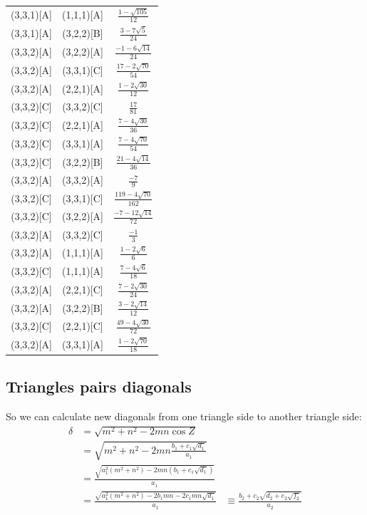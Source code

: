 \documentclass[11pt]{article}
\begin{document}
\begin{center}
\begin{tabular}{||c c c ||}
(3,3,1)[A] & (1,1,1)[A] & $\frac{1-\sqrt{105}}{12}$\\
(3,3,1)[A] & (3,2,2)[B] & $\frac{3-7\sqrt{5}}{24}$\\
 \hline
(3,3,2)[A] & (3,2,2)[A] & $\frac{-1-6\sqrt{14}}{24}$\\
(3,3,2)[A] & (3,3,1)[C] & $\frac{17-2\sqrt{70}}{54}$\\
(3,3,2)[A] & (2,2,1)[A] & $\frac{1-2\sqrt{30}}{12}$\\
(3,3,2)[C] & (3,3,2)[C] & $\frac{17}{81}$\\
(3,3,2)[C] & (2,2,1)[A] & $\frac{7-4\sqrt{30}}{36}$\\
(3,3,2)[C] & (3,3,1)[A] & $\frac{7-4\sqrt{70}}{54}$\\
(3,3,2)[C] & (3,2,2)[B] & $\frac{21-4\sqrt{14}}{36}$\\
(3,3,2)[A] & (3,3,2)[A] & $\frac{-7}{9}$\\
(3,3,2)[C] & (3,3,1)[C] & $\frac{119-4\sqrt{70}}{162}$\\
(3,3,2)[C] & (3,2,2)[A] & $\frac{-7-12\sqrt{14}}{72}$\\
(3,3,2)[A] & (3,3,2)[C] & $\frac{-1}{3}$\\
(3,3,2)[A] & (1,1,1)[A] & $\frac{1-2\sqrt{6}}{6}$\\
(3,3,2)[C] & (1,1,1)[A] & $\frac{7-4\sqrt{6}}{18}$\\
(3,3,2)[A] & (2,2,1)[C] & $\frac{7-2\sqrt{30}}{24}$\\
(3,3,2)[A] & (3,2,2)[B] & $\frac{3-2\sqrt{14}}{12}$\\
(3,3,2)[C] & (2,2,1)[C] & $\frac{49-4\sqrt{30}}{72}$\\
(3,3,2)[A] & (3,3,1)[A] & $\frac{1-2\sqrt{70}}{18}$\\
 \hline
\end{tabular}
\end{center}





\subsection{Triangles pairs diagonals}


So we can calculate new diagonals from one triangle side to another triangle side:
\begin{align}
\delta &= \sqrt{m^2 + n^2 - 2mn\cos{Z}}\\
 &= \sqrt{m^2 + n^2 - 2mn\frac{b_1+c_1\sqrt{d_1}}{a_1}}\\
 &= \frac{\sqrt{a_1^2(m^2 + n^2) - 2mn(b_1 + c_1\sqrt{d_1})}}{a_1}\\
 &= \frac{\sqrt{a_1^2(m^2 + n^2) - 2b_1mn - 2c_1mn\sqrt{d_1} }}{a_1} &\equiv \frac{b_2 + c_2\sqrt{d_2 + e_2\sqrt{f_2}}}{a_2}
\end{align}
\end{document}
